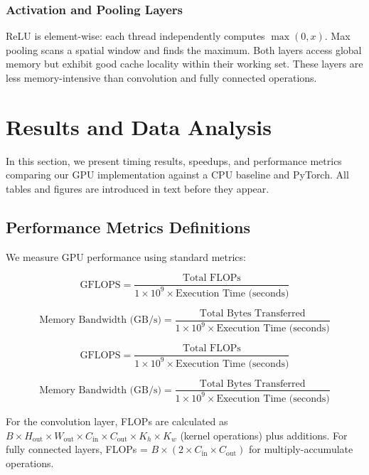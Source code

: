\documentclass[11pt]{article}
\begin{document}
\subsubsection{Activation and Pooling Layers}
ReLU is element-wise: each thread independently computes $\max(0, x)$. Max pooling scans a spatial window and finds the maximum. Both layers access global memory but exhibit good cache locality within their working set. These layers are less memory-intensive than convolution and fully connected operations.

\section{Results and Data Analysis}
In this section, we present timing results, speedups, and performance metrics comparing our GPU implementation against a CPU baseline and PyTorch. All tables and figures are introduced in text before they appear.

\subsection{Performance Metrics Definitions}
We measure GPU performance using standard metrics:

\begin{equation}
\text{GFLOPS} = \frac{\text{Total FLOPs}}{1 \times 10^9 \times \text{Execution Time (seconds)}}
\end{equation}

\begin{equation}
\text{Memory Bandwidth (GB/s)} = \frac{\text{Total Bytes Transferred}}{1 \times 10^9 \times \text{Execution Time (seconds)}}
\end{equation}

\begin{equation}
\text{GFLOPS} = \frac{\text{Total FLOPs}}{1 \times 10^9 \times \text{Execution Time (seconds)}}
\end{equation}

\begin{equation}
\text{Memory Bandwidth (GB/s)} = \frac{\text{Total Bytes Transferred}}{1 \times 10^9 \times \text{Execution Time (seconds)}}
\end{equation}

For the convolution layer, FLOPs are calculated as $B \times H_{\text{out}} \times W_{\text{out}} \times C_{\text{in}} \times C_{\text{out}} \times K_h \times K_w$ (kernel operations) plus additions. For fully connected layers, FLOPs = $B \times (2 \times C_{\text{in}} \times C_{\text{out}})$ for multiply-accumulate operations.
\end{document}
